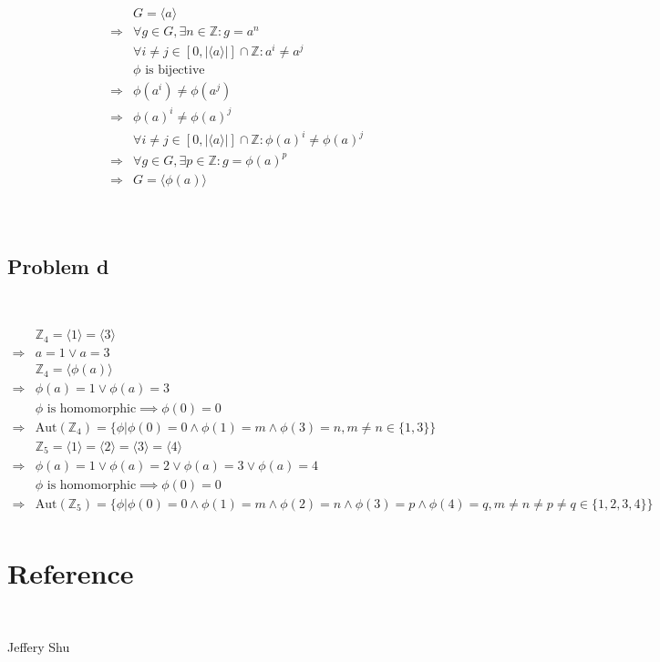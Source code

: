 \documentclass{article}
\begin{document}
\begin{equation*}
    \begin{split}
        &G=\langle a\rangle\\
        \Rightarrow&\forall g\in G,\exists n\in \mathbb{Z} :g=a^n\\
        &\forall i\ne j\in[0,|\langle a\rangle|]\cap\mathbb{Z} :a^i\ne a^j\\
        &\phi\text{ is bijective}\\
        \Rightarrow&\phi(a^i)\ne\phi(a^j)\\
        \Rightarrow&\phi(a)^i\ne\phi(a)^j\\
        &\forall i\ne j\in[0,|\langle a\rangle|]\cap\mathbb{Z} :\phi(a)^i\ne\phi(a)^j\\
        \Rightarrow&\forall g\in G,\exists p\in\mathbb{Z} :g=\phi(a)^p\\
        \Rightarrow&G=\langle \phi(a)\rangle\\
    \end{split}
\end{equation*}

~

\subsection*{Problem d}

~

\begin{equation*}
    \begin{split}
        &\mathbb{Z}_4=\langle1\rangle=\langle3\rangle\\
        \Rightarrow&a=1\lor a=3\\
        &\mathbb{Z}_4=\langle\phi(a)\rangle\\
        \Rightarrow&\phi(a)=1\lor \phi(a)=3\\
        &\phi\text{ is homomorphic}\implies \phi(0)=0\\
        \Rightarrow&\text{Aut}(\mathbb{Z} _4)=\{\phi|\phi(0)=0\land\phi(1)=m\land\phi(3)=n,m\ne n\in\{1,3\}\}\\
        &\mathbb{Z} _5=\langle1\rangle=\langle2\rangle=\langle3\rangle=\langle4\rangle\\
        \Rightarrow&\phi(a)=1\lor \phi(a)=2\lor\phi(a)=3\lor\phi(a)=4\\
        &\phi\text{ is homomorphic}\implies \phi(0)=0\\
        \Rightarrow&\text{Aut}(\mathbb{Z} _5)=\{\phi|\phi(0)=0\land\phi(1)=m\land\phi(2)=n\land\phi(3)=p\land\phi(4)=q,m\ne n\ne p\ne q\in\{1,2,3,4\}\}\\
    \end{split}
\end{equation*}

\newpage

\section*{Reference}

~

Jeffery Shu
\end{document}
